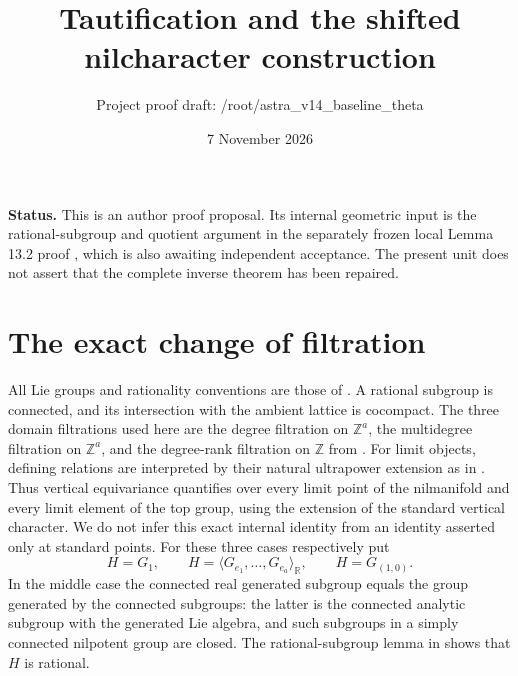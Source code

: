 \documentclass[11pt]{article}
\title{Tautification and the shifted nilcharacter construction}
\author{Project proof draft: /root/astra\_v14\_baseline\_theta}
\date{7 November 2026}
\newcommand{\Z}{\mathbb Z}
\newcommand{\R}{\mathbb R}
\begin{document}
\maketitle
\noindent\textbf{Status.} This is an author proof proposal. Its internal
geometric input is the rational-subgroup and quotient argument in the separately
frozen local Lemma 13.2 proof \cite{LP13}, which is also awaiting independent
acceptance. The present unit does not assert that the complete inverse theorem
has been repaired.

\section{The exact change of filtration}

All Lie groups and rationality conventions are those of
\cite[Sections 3--6]{GTZ}. A rational subgroup is connected, and its intersection
with the ambient lattice is cocompact. The three domain filtrations used here
are the degree filtration on $\Z^a$, the multidegree filtration on $\Z^a$,
and the degree-rank filtration on $\Z$ from \cite[Definition 6.17]{GTZ}.
For limit objects, defining relations are interpreted by their natural
ultrapower extension as in \cite[Appendix A.2--A.3, pp.~1324--1325]{GTZ}.
Thus vertical equivariance quantifies over every limit point of the
nilmanifold and every limit element of the top group, using the extension
of the standard vertical character. We do not infer this exact internal
identity from an identity asserted only at standard points.
For these three cases respectively put
\[
 H=G_1,\qquad H=\langle G_{e_1},\ldots,G_{e_a}\rangle_{\R},
 \qquad H=G_{(1,0)}.
\]
In the middle case the connected real generated subgroup equals the group
generated by the connected subgroups: the latter is the connected analytic
subgroup with the generated Lie algebra, and such subgroups in a simply
connected nilpotent group are closed. The rational-subgroup lemma in
\cite[Section 2]{LP13} shows that $H$ is rational.
\end{document}
